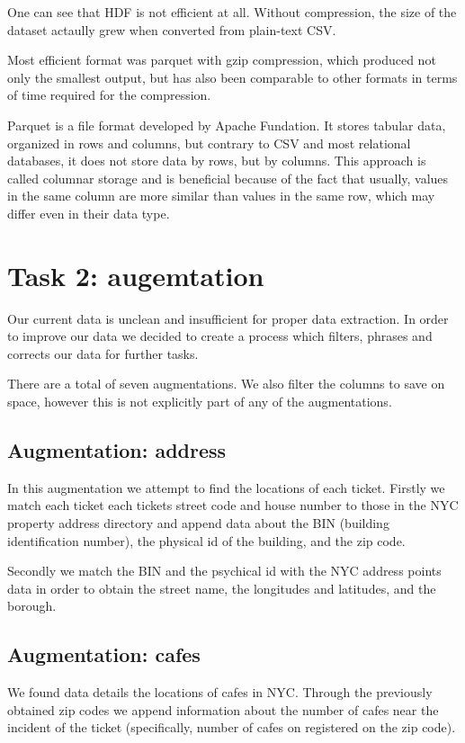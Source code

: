 \documentclass[12pt]{fphw}
\begin{document}
One can see that HDF is not efficient at all. Without compression, the size of the dataset actaully grew when converted from plain-text CSV. 

Most efficient format was parquet with gzip compression, which produced not only the smallest output, but has also been comparable to other formats in terms of time required for the compression.

Parquet is a file format developed by Apache Fundation. It stores tabular data, organized in rows and columns, but contrary to CSV and most relational databases, it does not store data by rows, but by columns. This approach is called columnar storage and is beneficial because of the fact that usually, values in the same column are more similar than values in the same row, which may differ even in their data type. 

\section{Task 2: augemtation}

Our current data is unclean and insufficient for proper data extraction. In order to improve our data we decided to create a process which filters, phrases and corrects our data for further tasks.

There are a total of seven augmentations. We also filter the columns to save on space, however this is not explicitly part of any of the augmentations.

\subsection{Augmentation: address}

In this augmentation we attempt to find the locations of each ticket. Firstly we match each ticket each tickets street code and house number to those in the NYC property address directory\cite{bobaadr} and append data about the BIN (building identification number), the physical id of the building, and the zip code.

Secondly we match the BIN and the psychical id with the NYC address points\cite{address_point} data in order to obtain the street name, the longitudes and latitudes, and the borough.

\subsection{Augmentation: cafes}

We found data details the locations of cafes in NYC\cite{cafes}. Through the previously obtained zip codes we append information about the number of cafes near the incident of the ticket (specifically, number of cafes on registered on the zip code).
\end{document}
